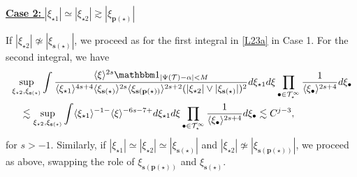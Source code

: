 \documentclass[%
11pt,  reqno]{amsart}
\newcommand{\5}{\textup{V}}
\newcommand{\noi}{\noindent}
\newcommand{\ind}{\mathbbm 1}
\newcommand{\les}{\lesssim}
\theoremstyle{remark}
\newcommand{\bul}{\bullet}
\newcommand{\TT}{\mathcal{T}}
\newcommand{\al}{\alpha}
\newcommand{\pb}{\mathbf{p}}
\newcommand{\sbf}{\mathbf{s}}
\newcommand{\ges}{\gtrsim}
\newcommand{\jb}[1]
{\langle #1 \rangle}
\numberwithin{equation}{section}
\numberwithin{theorem}{section}
\begin{document}
\smallskip
\noi
\underline{\textbf{Case 2:} $|\xi_{\star1}| \simeq |\xi_{\star2}| \ges |\xi_{\pb(\star)}|$}

If $|\xi_{\star2}| \not\simeq |\xi_{\sbf(\star)}|$, we proceed as for the first integral in \eqref{L23a} in Case 1. For the second integral, we have
\begin{align}\label{L23b}
&
    \sup_{\xi_{\star2}, \xi_{\sbf(\star)}} 
    \int 
    \frac{\jb{\xi}^{2s} \ind_{|\Psi(\TT)-\al|< M }   }{ \jb{\xi_{\star1}}^{4s+4} \jb{\xi_{\sbf(\star)}}^{2s} \jb{\xi_{\sbf(\pb(\star))}}^{2s+2} (|\xi_{\star2}| \lor |\xi_{\sbf(\star)}|)^2  }
    d\xi_{\star1} d\xi 
    \prod_{\bul\in\TT^\infty_\star} \frac{1}{\jb{\xi_\bul}^{2s+4}} d\xi_\bul
    \\
    &
    \quad 
    \les 
    \sup_{\xi_{\star2}, \xi_{\sbf(\star)}} 
    \int \jb{\xi_{\star1}}^{-1-} \jb{\xi}^{-6s-7+} d\xi_{\star1} d\xi \prod_{\bul\in\TT^\infty_\star} \frac{1}{\jb{\xi_\bul}^{2s+4}} d\xi_\bul
    \les C^{j-3 } , 
\end{align}
for $s> -1$. 
% 
% 
Similarly, if $|\xi_{\star1}| \simeq |\xi_{\star2}| \simeq |\xi_{\sbf(\star)}|$ and $|\xi_{\star2}| \not\simeq |\xi_{\sbf(\pb(\star))}|$, we proceed as above, swapping the role of $\xi_{\sbf(\pb(\star))}$ and $\xi_{\sbf(\star)}$. 
\end{document}
